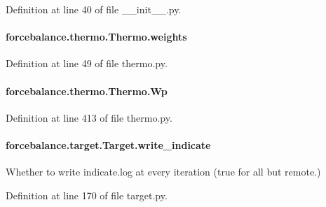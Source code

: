 Definition at line 40 of file \-\_\-\-\_\-init\-\_\-\-\_\-.\-py.

\hypertarget{classforcebalance_1_1thermo_1_1Thermo_a2821e61578dac23a40db4788abacda0f}{
\paragraph[{weights}]{\setlength{\rightskip}{0pt plus 5cm}forcebalance.\-thermo.\-Thermo.\-weights}}\label{classforcebalance_1_1thermo_1_1Thermo_a2821e61578dac23a40db4788abacda0f}


Definition at line 49 of file thermo.\-py.

\hypertarget{classforcebalance_1_1thermo_1_1Thermo_ace1a9dd4cc6b80f40a10d56309b30a01}{
\paragraph[{Wp}]{\setlength{\rightskip}{0pt plus 5cm}forcebalance.\-thermo.\-Thermo.\-Wp}}\label{classforcebalance_1_1thermo_1_1Thermo_ace1a9dd4cc6b80f40a10d56309b30a01}


Definition at line 413 of file thermo.\-py.

\hypertarget{classforcebalance_1_1target_1_1Target_a3a2f5d4bbb8d6ecb580eadb261977a57}{
\paragraph[{write\-\_\-indicate}]{\setlength{\rightskip}{0pt plus 5cm}forcebalance.\-target.\-Target.\-write\-\_\-indicate\hspace{0.3cm}{\ttfamily [inherited]}}}\label{classforcebalance_1_1target_1_1Target_a3a2f5d4bbb8d6ecb580eadb261977a57}


Whether to write indicate.\-log at every iteration (true for all but remote.) 



Definition at line 170 of file target.\-py.

